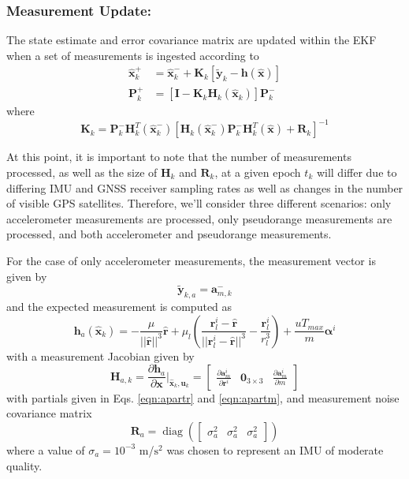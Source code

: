 \documentclass[letterpaper, paper,11pt]{AAS}		%
\begin{document}
 \subsubsection{Measurement Update:}
 The state estimate and error covariance matrix are updated within the EKF when a set of measurements is ingested
 according to \cite{Crassidis_2004}
 \begin{align}
 	\hat{\mathbf{x}}_k^+ &= \hat{\mathbf{x}}_k^- + \mathbf{K}_k\left[\tilde{\mathbf{y}}_k - \mathbf{h}(\hat{\mathbf{x}})\right] \\
 	\mathbf{P}_k^+ &= \left[\mathbf{I} - \mathbf{K}_k \mathbf{H}_k(\hat{\mathbf{x}}_k)\right]\mathbf{P}_k^-
 \end{align} 
where
\begin{equation}
	\mathbf{K}_k = \mathbf{P}_k^-\mathbf{H}_k^T(\hat{\mathbf{x}}_k^-)\left[\mathbf{H}_k(\hat{\mathbf{x}}_k^-)\mathbf{P}_k^-\mathbf{H}_k^T(\hat{\mathbf{x}}) + \mathbf{R}_k\right]^{-1}
\end{equation}

At this point, it is important to note that the number of measurements processed, as well as the size of $\mathbf{H}_k$ and $\mathbf{R}_k$, at a given epoch $t_k$ will differ due to differing IMU and GNSS receiver sampling rates as well as changes in the number of visible GPS satellites. Therefore, we'll consider three different scenarios: only accelerometer measurements are processed, only pseudorange measurements are processed, and both accelerometer and pseudorange measurements. 

For the case of only accelerometer measurements, the measurement vector is given by
\begin{equation}
	\tilde{\mathbf{y}}_{k,a} = \mathbf{a}_{m,k}^-
\end{equation}
and the expected measurement is computed as 
\begin{equation}
	\mathbf{h}_{a}(\hat{\mathbf{x}}_k) = 	-\frac{\mu}{||\hat{\mathbf{r}}||^3}\hat{\mathbf{r}} + \mu_l\left(\frac{\mathbf{r}_l^i - \hat{\mathbf{r}}}{||\mathbf{r}_l^i - \hat{\mathbf{r}}||^3} - \frac{\mathbf{r}_l^i}{r_l^3}\right)  + \frac{uT_{max}}{m}\boldsymbol{\alpha}^i 
\end{equation}
with a measurement Jacobian given by
\begin{equation}
	\mathbf{H}_{a,k} = \frac{\partial \mathbf{h}_a}{\partial \mathbf{x}}\bigg|_{\hat{\mathbf{x}}_k,\mathbf{u}_k}  = \begin{bmatrix}
		\frac{\partial \mathbf{a}^i_m}{\partial \mathbf{r}^i} & \mathbf{0}_{3\times 3} & \frac{\partial \mathbf{a}_m^i}{\partial m}
	\end{bmatrix}
\end{equation}
with partials given in Eqs. \eqref{eqn:apartr} and \eqref{eqn:apartm}, and measurement noise covariance matrix 
\begin{equation}
	\mathbf{R}_a = \operatorname{diag}(\begin{bmatrix}
		\sigma_a^2 & \sigma_a^2 & \sigma_a^2 
	\end{bmatrix})
\end{equation}
where a value of $\sigma_a = 10^{-3}$ m/$\text{s}^2$ was chosen to represent an IMU of moderate quality.
\end{document}
